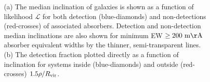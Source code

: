 \documentclass[twocolumn,tighten]{aastex62}
\begin{document}
\begin{figure}[ht!]
        \centering
        \vspace{0pt}
        \caption{\small{(a) The median inclination of galaxies is shown as a function of likelihood $\mathcal{L}$ for both detection (blue-diamonds) and non-detections (red-crosses) of associated absorbers. Detection and non-detection median inclinations are also shown for minimum EW $\rm \ge 200~ m\AA$ absorber equivalent widths by the thinner, semi-transparent lines. (b) The detection fraction plotted directly as a function of inclination for systems inside (blue-diamonds) and outside (red-crosses) $1.5 \rho / R_{\rm vir}$.}}
        \vspace{5pt}
        \label{b_all}
\end{figure}
\end{document}
